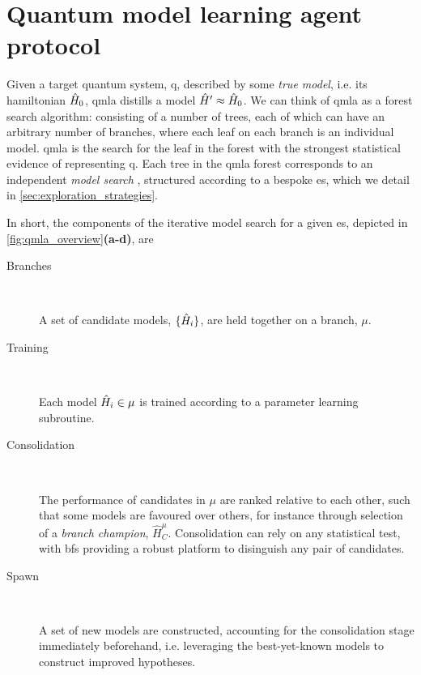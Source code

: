 \section{Quantum model learning agent protocol}\label{sec:qmla_protocol}
Given a target quantum system, \gls{q}, described by some \emph{\gls{true model}}, i.e. its \gls{hamiltonian} $\hat{H}_0$, 
    \gls{qmla} distills a \gls{model} $\hat{H}^{\prime} \approx \hat{H}_0$.
We can think of \gls{qmla} as a forest search algorithm\footnotemark:
    consisting of a number of trees, each of which can have an arbitrary number of branches, 
    where each leaf on each branch is an individual \gls{model}.
    \gls{qmla} is the search for the leaf in the forest with the 
    strongest statistical evidence of representing \gls{q}. 
Each tree in the \gls{qmla} forest corresponds to an independent \emph{ \gls{model search} }, 
    structured according to a bespoke \gls{es}, which we detail in \cref{sec:exploration_strategies}. 
\par 
In short, the components of the iterative \gls{model search} for a given \gls{es}, 
    depicted in \cref{fig:qmla_overview}\textbf{(a-d)}, are
\begin{description}
    \item[Branches] \ 
    
    A set of candidate models, $\{ \hat{H}_i \}$, are held together on a branch, $\mu$. 
    
    \item[Training] \ 
    
    Each model $\hat{H}_i \in \mu$ is trained according to a parameter learning subroutine.
    
    \item[Consolidation] \ 
    
    The performance of candidates in $\mu$ are ranked relative to each other, 
        such that some models are favoured over others, for instance through selection of a \emph{branch champion}, $\hat{H}_C^{\mu}$. 
        Consolidation can rely on any statistical test, with \glspl{bf} providing a robust platform to disinguish 
        any pair of candidates.
    
    \item[Spawn] \  
    
    A set of new models are constructed, accounting for the consolidation stage immediately beforehand, 
        i.e. leveraging the best-yet-known models to construct improved hypotheses.
\end{description}

